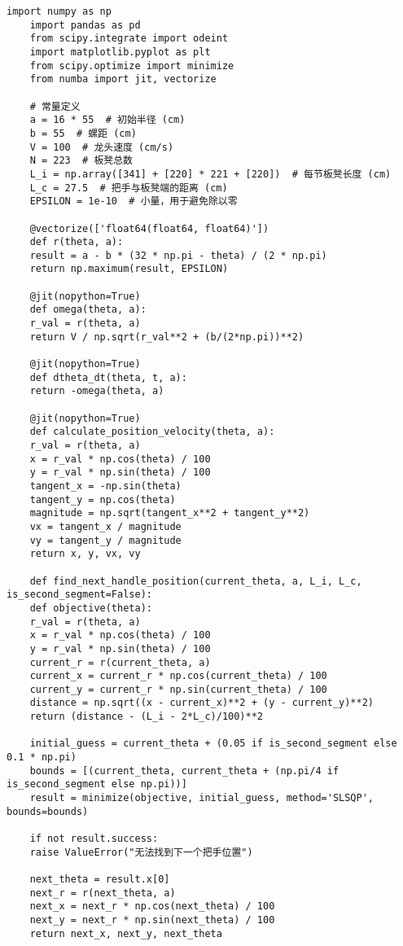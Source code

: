 
\begin{lstlisting}[caption={问题二处理代码1}]
	import numpy as np
	import pandas as pd
	from scipy.integrate import odeint
	import matplotlib.pyplot as plt
	from scipy.optimize import minimize
	from numba import jit, vectorize
	
	# 常量定义
	a = 16 * 55  # 初始半径 (cm)
	b = 55  # 螺距 (cm)
	V = 100  # 龙头速度 (cm/s)
	N = 223  # 板凳总数
	L_i = np.array([341] + [220] * 221 + [220])  # 每节板凳长度 (cm)
	L_c = 27.5  # 把手与板凳端的距离 (cm)
	EPSILON = 1e-10  # 小量，用于避免除以零
	
	@vectorize(['float64(float64, float64)'])
	def r(theta, a):
	result = a - b * (32 * np.pi - theta) / (2 * np.pi)
	return np.maximum(result, EPSILON)
	
	@jit(nopython=True)
	def omega(theta, a):
	r_val = r(theta, a)
	return V / np.sqrt(r_val**2 + (b/(2*np.pi))**2)
	
	@jit(nopython=True)
	def dtheta_dt(theta, t, a):
	return -omega(theta, a)
	
	@jit(nopython=True)
	def calculate_position_velocity(theta, a):
	r_val = r(theta, a)
	x = r_val * np.cos(theta) / 100
	y = r_val * np.sin(theta) / 100
	tangent_x = -np.sin(theta)
	tangent_y = np.cos(theta)
	magnitude = np.sqrt(tangent_x**2 + tangent_y**2)
	vx = tangent_x / magnitude
	vy = tangent_y / magnitude
	return x, y, vx, vy
	
	def find_next_handle_position(current_theta, a, L_i, L_c, is_second_segment=False):
	def objective(theta):
	r_val = r(theta, a)
	x = r_val * np.cos(theta) / 100
	y = r_val * np.sin(theta) / 100
	current_r = r(current_theta, a)
	current_x = current_r * np.cos(current_theta) / 100
	current_y = current_r * np.sin(current_theta) / 100
	distance = np.sqrt((x - current_x)**2 + (y - current_y)**2)
	return (distance - (L_i - 2*L_c)/100)**2
	
	initial_guess = current_theta + (0.05 if is_second_segment else 0.1 * np.pi)
	bounds = [(current_theta, current_theta + (np.pi/4 if is_second_segment else np.pi))]
	result = minimize(objective, initial_guess, method='SLSQP', bounds=bounds)
	
	if not result.success:
	raise ValueError("无法找到下一个把手位置")
	
	next_theta = result.x[0]
	next_r = r(next_theta, a)
	next_x = next_r * np.cos(next_theta) / 100
	next_y = next_r * np.sin(next_theta) / 100
	return next_x, next_y, next_theta
	

\end{lstlisting}
